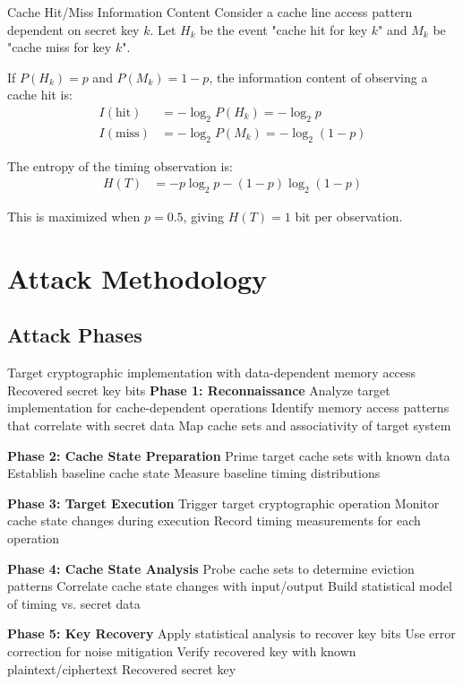 \documentclass[11pt,a4paper]{article}
\theoremstyle{definition}
\begin{document}
\begin{mathematicsbox}{Cache Hit/Miss Information Content}
Consider a cache line access pattern dependent on secret key $k$. Let $H_k$ be the event "cache hit for key $k$" and $M_k$ be "cache miss for key $k$".

If $P(H_k) = p$ and $P(M_k) = 1-p$, the information content of observing a cache hit is:
\begin{align}
I(\text{hit}) &= -\log_2 P(H_k) = -\log_2 p \\
I(\text{miss}) &= -\log_2 P(M_k) = -\log_2(1-p)
\end{align}

The entropy of the timing observation is:
\begin{align}
H(T) &= -p \log_2 p - (1-p) \log_2(1-p)
\end{align}

This is maximized when $p = 0.5$, giving $H(T) = 1$ bit per observation.
\end{mathematicsbox}

\section{Attack Methodology}

\subsection{Attack Phases}

\begin{algorithm}
\caption{General Cache-Timing Attack Framework}
\begin{algorithmic}[1]
\REQUIRE Target cryptographic implementation with data-dependent memory access
\ENSURE Recovered secret key bits
\STATE \textbf{Phase 1: Reconnaissance}
\STATE Analyze target implementation for cache-dependent operations
\STATE Identify memory access patterns that correlate with secret data
\STATE Map cache sets and associativity of target system

\STATE \textbf{Phase 2: Cache State Preparation}
\STATE Prime target cache sets with known data
\STATE Establish baseline cache state
\STATE Measure baseline timing distributions

\STATE \textbf{Phase 3: Target Execution}
\STATE Trigger target cryptographic operation
\STATE Monitor cache state changes during execution
\STATE Record timing measurements for each operation

\STATE \textbf{Phase 4: Cache State Analysis}
\STATE Probe cache sets to determine eviction patterns
\STATE Correlate cache state changes with input/output
\STATE Build statistical model of timing vs. secret data

\STATE \textbf{Phase 5: Key Recovery}
\STATE Apply statistical analysis to recover key bits
\STATE Use error correction for noise mitigation  
\STATE Verify recovered key with known plaintext/ciphertext
\RETURN Recovered secret key
\end{algorithmic}
\end{algorithm}
\end{document}
